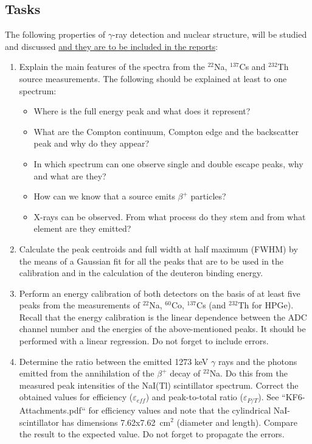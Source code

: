 \documentclass[12pt]{article}
\begin{document}
\subsection{Tasks}
The following properties of $\gamma$-ray detection and nuclear structure, will be studied and discussed \underline{and they are to be included in the reports}:
\begin{enumerate}
  \item Explain the main features of the spectra from the $^{22}$Na, $^{137}$Cs and $^{232}$Th source measurements. The following should be explained at least to one spectrum:
    \begin{itemize}
      \item Where is the full energy peak and what does it represent?
      \item What are the Compton continuum, Compton edge and the backscatter peak and why do they appear?
      \item In which spectrum can one observe single and double escape peaks, why and what are they?
      \item How can we know that a source emits $\beta^{+}$ particles?
      \item X-rays can be observed. From what process do they stem and from what element are they emitted?
    \end{itemize}
  \item Calculate the peak centroids and full width at half maximum (FWHM) by the means of a Gaussian fit for all the peaks that are to be used in the calibration and in the calculation of the deuteron binding energy.
  \item Perform an energy calibration of both detectors on the basis of at least five peaks from the measurements of $^{22}$Na, $^{60}$Co, $^{137}$Cs (and $^{232}$Th for HPGe). Recall that the energy calibration is the linear dependence between the ADC channel number and the energies of the above-mentioned peaks. It should be performed with a linear regression. Do not forget to include errors.
  \item Determine the ratio between the emitted 1273 keV $\gamma$ rays and the photons emitted from the annihilation of the $\beta^+$ decay of $^{22}$Na. Do this from the measured peak intensities of the NaI(Tl) scintillator spectrum. Correct the obtained values for efficiency ($\varepsilon_{eff}$) and peak-to-total ratio ($\varepsilon_{P/T}$). See ``KF6-Attachments.pdf`` for efficiency values and note that the cylindrical NaI-scintillator has dimensions 7.62x7.62~cm$^2$ (diameter and length). Compare the result to the expected value. Do not forget to propagate the errors.

\end{enumerate}
\end{document}
